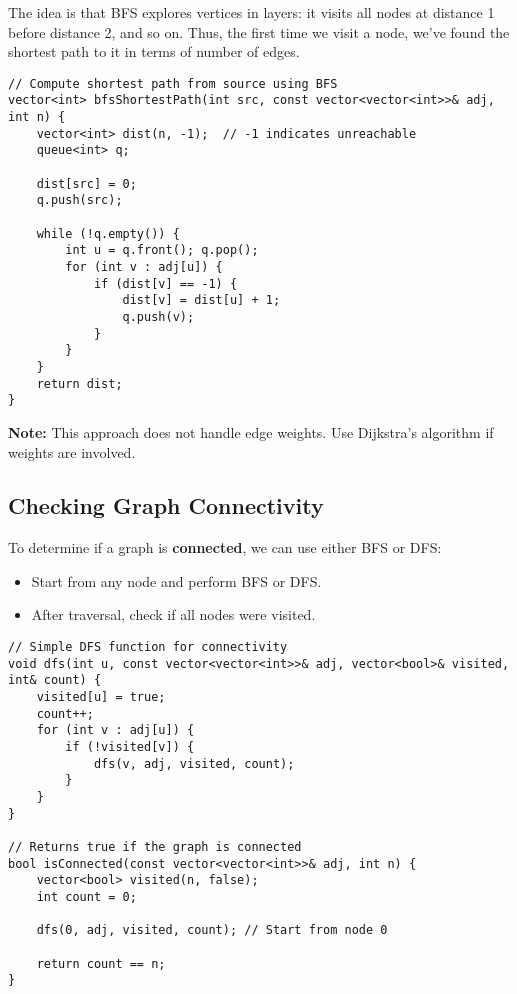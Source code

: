\documentclass{article}
\begin{document}
The idea is that BFS explores vertices in layers: it visits all nodes at distance 1 before distance 2, and so on. Thus, the first time we visit a node, we've found the shortest path to it in terms of number of edges.

\begin{lstlisting}[style=cppstyle]
// Compute shortest path from source using BFS
vector<int> bfsShortestPath(int src, const vector<vector<int>>& adj, int n) {
    vector<int> dist(n, -1);  // -1 indicates unreachable
    queue<int> q;

    dist[src] = 0;
    q.push(src);

    while (!q.empty()) {
        int u = q.front(); q.pop();
        for (int v : adj[u]) {
            if (dist[v] == -1) {
                dist[v] = dist[u] + 1;
                q.push(v);
            }
        }
    }
    return dist;
}
\end{lstlisting}

\textbf{Note:} This approach does not handle edge weights. Use Dijkstra’s algorithm if weights are involved.

\subsection{Checking Graph Connectivity}

To determine if a graph is \textbf{connected}, we can use either BFS or DFS:

\begin{itemize}
    \item Start from any node and perform BFS or DFS.
    \item After traversal, check if all nodes were visited.
\end{itemize}

\begin{lstlisting}[style=cppstyle]
// Simple DFS function for connectivity
void dfs(int u, const vector<vector<int>>& adj, vector<bool>& visited, int& count) {
    visited[u] = true;
    count++;
    for (int v : adj[u]) {
        if (!visited[v]) {
            dfs(v, adj, visited, count);
        }
    }
}

// Returns true if the graph is connected
bool isConnected(const vector<vector<int>>& adj, int n) {
    vector<bool> visited(n, false);
    int count = 0;

    dfs(0, adj, visited, count); // Start from node 0

    return count == n;
}
\end{lstlisting}
\end{document}
